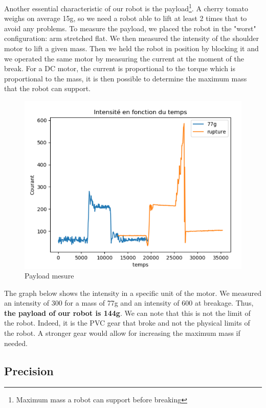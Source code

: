 Another essential characteristic of our robot is the \gls{payload}\footnote{Maximum mass a robot can support before breaking}. A cherry tomato weighs on average 15g, so we need a robot able to lift at least 2 times that to avoid any problems. To measure the payload, we placed the robot in the "worst" configuration: arm stretched flat. We then measured the intensity of the shoulder motor to lift a given mass. Then we held the robot in position by blocking it and we operated the same motor by measuring the current at the moment of the break. For a DC motor, the current is proportional to the torque which is proportional to the mass, it is then possible to determine the maximum mass that the robot can support. 
\begin{figure}[H]
    \centering
    \includegraphics[scale=0.3]{Images/Section04/payload.png}
    \caption{Payload mesure}
    \label{fig:Payload}
\end{figure}
\FloatBarrier

The graph below shows the intensity in a specific unit of the motor. We measured an intensity of 300 for a mass of 77g and an intensity of 600 at breakage. Thus, \textbf{the payload of our robot is 144g}. We can note that this is not the limit of the robot. Indeed, it is the PVC gear that broke and not the physical limits of the robot. A stronger gear would allow for increasing the maximum mass if needed.

\subsection{Precision}

